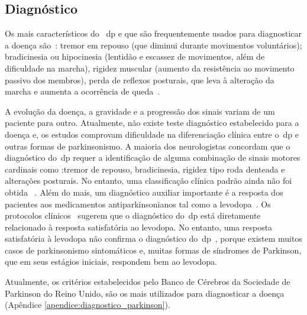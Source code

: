 \subsection{Diagnóstico}
Os mais característicos do ~\ac{dp} e que são frequentemente usados para diagnosticar a doença são~\cite{rowlandtratado}: tremor em repouso (que diminui durante movimentos voluntários); bradicinesia ou hipocinesia (lentidão e escassez de movimentos, além de dificuldade na marcha), rigidez muscular (aumento da resistência ao movimento passivo dos membros), perda de reflexos posturais, que leva à alteração da marcha e aumenta a ocorrência de queda~\cite{rodrigues2006,tolosa06}. 

A evolução da doença, a gravidade e a progressão dos sinais variam de um paciente para outro. Atualmente, não existe teste diagnóstico estabelecido para a doença e, os estudos comprovam dificuldade na diferenciação clínica entre o~\ac{dp} e outras formas de parkinsonismo. A maioria dos neurologistas concordam que o diagnóstico do~\ac{dp} requer a identificação de alguma combinação de sinais motores cardinais como :tremor de repouso, bradicinesia, rigidez tipo roda denteada e alterações posturais. No entanto, uma classificação clínica padrão ainda não foi obtida ~\cite{protpar010}. Além do mais, um diagnóstico auxiliar importante é a resposta dos pacientes aos medicamentos antiparkinsonianos tal como a levodopa~\cite{protpar010}. Os protocolos clínicos~\cite{protpar010,national2006parkinson} sugerem que o diagnóstico do~\ac{dp} está diretamente relacionado à resposta satisfatória ao levodopa. No entanto, uma resposta satisfatória à levodopa não confirma o diagnóstico do~\ac{dp}~\cite{rowlandtratado}, porque 
existem muitos casos de parkinsonismo sintomáticos e, muitas formas de síndromes de Parkinson, que em seus estágios iniciais, respondem bem ao levodopa. 

Atualmente, os critérios estabelecidos pelo Banco de Cérebros da Sociedade de Parkinson do Reino Unido, são os mais utilizados para diagnosticar a doença~\cite{protpar010} (Apêndice \ref{apendice:diagnostico_parkinson}). 



